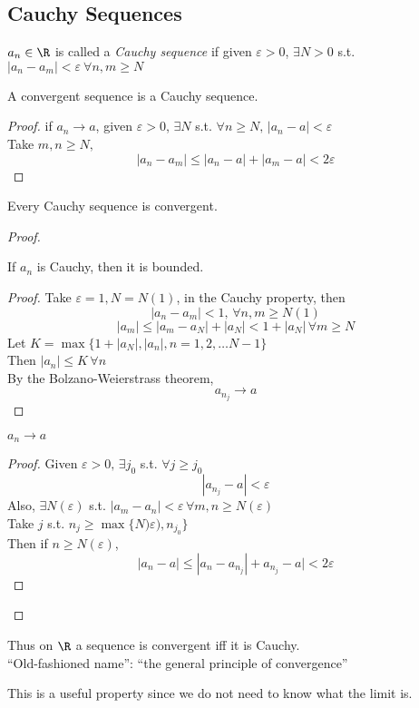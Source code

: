 \subsection{Cauchy Sequences}
\begin{definition}
$a_n \in \R$ is called a \emph{Cauchy sequence} if given $\varepsilon > 0$, $\exists N > 0$ s.t. $|a_n - a_m| < \varepsilon \ \forall n,m \geq N$
\end{definition}
\begin{lemma}
A convergent sequence is a Cauchy sequence.
\begin{proof}
if $a_n \to a$, given $\varepsilon > 0$, $\exists N$ s.t. $\forall n \geq N,\, |a_n - a| < \varepsilon$\\
Take $m,n \geq N,$
\[|a_n - a_m| \leq |a_n - a| + |a_m - a| < 2\varepsilon\] 
\end{proof}
\end{lemma}
\begin{theorem}
Every Cauchy sequence is convergent.
\begin{proof}
\hfill{ }
\begin{claim}
If $a_n$ is Cauchy, then it is bounded.
\end{claim}
\begin{proof}
Take $\varepsilon = 1, N = N(1)$, in the Cauchy property,
then \[|a_n - a_m|<1,\, \forall n,m \geq N(1)\]
\[|a_m| \leq |a_m - a_N| + |a_N| < 1 + |a_N| \, \forall m \geq N\]
Let $K = \max\{1+ |a_N|,|a_n|,n = 1,2,\dots N-1\}$\\
Then $|a_n| \leq K \, \forall n$ \tick\\
By the Bolzano-Weierstrass theorem,
\[a_{n_j} \to a\]
\end{proof}
\begin{claim}
$a_n \to a$
\end{claim}
\begin{proof}
Given $\varepsilon > 0, \, \exists j_0$ s.t. $\forall j \geq j_0$
\[|a_{n_j} - a|<\varepsilon\]
Also, $\exists N(\varepsilon)$ s.t. $|a_m - a_n| < \varepsilon \, \forall m,n \geq N(\varepsilon)$\\
Take $j$ s.t. $n_j \geq \max\{N)\varepsilon),n_{j_0}\}$\\
Then if $n \geq N(\varepsilon)$,
\[|a_n - a| \leq |a_n - a_{n_j}| + a_{n_j} - a| < 2 \varepsilon\]
\end{proof}
\end{proof}
\end{theorem}
\begin{remark}
Thus on $\R$ a sequence is convergent iff it is Cauchy.\\
``Old-fashioned name'': ``the general principle of convergence''
\end{remark}
\begin{note}
This is a useful property since we do not need to know what the limit is.
\end{note}
